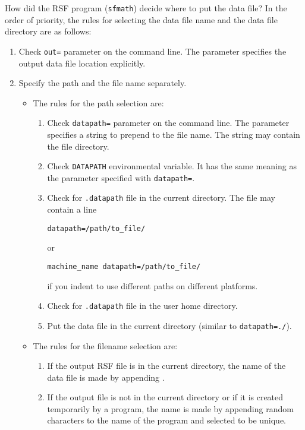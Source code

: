 How did the RSF program (\texttt{sfmath}) decide where to put the data file?
In the order of priority, the rules for selecting the data file name and the
data file directory are as follows:
\begin{enumerate}
\item Check \texttt{out=} parameter on the command line. The parameter
  specifies the output data file location explicitly.
\item Specify the path and the file name separately. 
  \begin{itemize}
  \item The rules for the path
  selection are:
  \begin{enumerate}
  \item Check \texttt{datapath=} parameter on the command line. The parameter
    specifies a string to prepend to the file name. The string may contain the
    file directory.
  \item Check \texttt{DATAPATH} environmental variable. It has the same meaning
    as the parameter specified with \texttt{datapath=}.
  \item Check for \texttt{.datapath} file in the current directory. The file may
    contain a line 
\begin{verbatim}
datapath=/path/to_file/
\end{verbatim}
    or
\begin{verbatim}
machine_name datapath=/path/to_file/
\end{verbatim}
    if you indent to use different paths on different platforms.
  \item Check for \texttt{.datapath} file in the user home directory.
  \item Put the data file in the current directory (similar to \texttt{datapath=./}).
  \end{enumerate}
  \item The rules for the filename selection are:
    \begin{enumerate}
    \item If the output RSF file is in the current directory, the name of the
      data file is made by appending \@.
    \item If the output file is not in the current directory or if it is
    created temporarily by a program, the name is made by appending random
    characters to the name of the program and selected to be unique.
  \end{enumerate}
  \end{itemize}
\end{enumerate}

